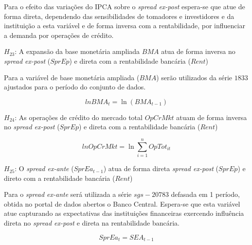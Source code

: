 \documentclass[
  12pt,
  12pt,
  openright,
  oneside,
  a4paper,
  chapter=TITLE,
  section=TITLE,
  subsection=TITLE,
  subsubsection=TITLE,
  english,
  portugues,
  sumario=tradicional]{abntex2}
\begin{document}
Para o efeito das variações do IPCA sobre o \emph{spread ex-post} espera-se que atue de forma direta, dependendo das sensibilidades de tomadores e investidores e da instituição a esta variável e de forma inversa com a rentabilidade, por influenciar a demanda por operações de crédito.

\(H_{23}\): A expansão da base monetária ampliada \(BMA\) atua de forma inversa no \emph{spread ex-post} (\(SprEp\)) e direta com a rentabilidade bancária (\(Rent\))

Para a variável de base monetária ampliada (\(BMA\)) serão utilizados da série \(1833\) ajustados para o período do conjunto de dados.

\begin{equation}
lnBMA_{t} = \ln(BMA_{t-1})
\end{equation}

\(H_{24}\): As operações de crédito do mercado total \(OpCrMkt\) atuam de forma inversa no \emph{spread ex-post} (\(SprEp\)) e direta com a rentabilidade bancária (\(Rent\))

\begin{equation}
lnOpCrMkt = \ln\sum_{i = 1}^nOpTot_{it}
\end{equation}

\(H_{25}\): O \emph{spread ex-ante} (\(SprEa_{t-1}\)) atua de forma direta \emph{spread ex-post} (\(SprEp\)) e direto com a rentabilidade bancária (\(Rent\))

Para o \emph{spread ex-ante} será utilizada a série \(sgs-20783\) defasada em 1 período, obtida no portal de dados abertos o Banco Central. Espera-se que esta variável atue capturando as expectativas das instituições financeiras exercendo influência direta no \emph{spread ex-post} e direta na rentabilidade bancária.

\begin{equation}
SprEa_{t} = SEA_{t-1}
\end{equation}

\vspace{20pt}
\vspace{-2mm}
\linespread{2}
\end{document}
